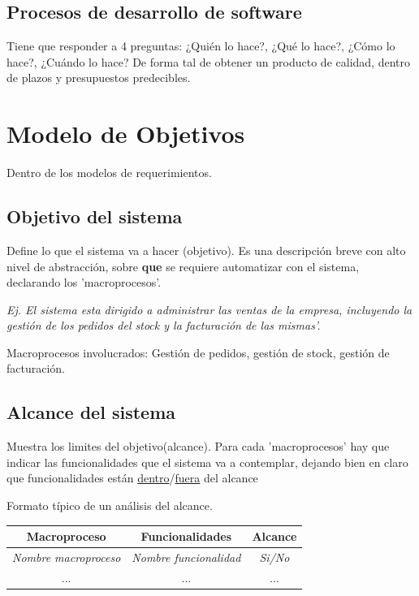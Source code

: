 \documentclass[titlepage,a4paper]{article}
\begin{document}
\subsection{Procesos de desarrollo de software}

Tiene que responder a 4 preguntas: ¿Quién lo hace?, ¿Qué lo hace?, ¿Cómo lo hace?, ¿Cuándo lo hace?
De forma tal de obtener un producto de calidad, dentro de plazos y presupuestos predecibles.

\section{Modelo de Objetivos}
Dentro de los modelos de requerimientos.
\subsection{Objetivo del sistema}
Define lo que el sistema va a hacer (objetivo).
Es una descripción breve con alto nivel de abstracción, sobre \textbf{que} se requiere automatizar con el sistema, declarando los 'macroprocesos'.

\textit{Ej.
El sistema esta dirigido a administrar las ventas de la empresa, incluyendo la gestión de los pedidos del stock y la facturación de las mismas'.}

Macroprocesos involucrados: Gestión de pedidos, gestión de stock, gestión de facturación.

\subsection{Alcance del sistema}
Muestra los limites del objetivo(alcance). Para cada 'macroprocesos' hay que indicar las funcionalidades que el sistema va a contemplar,
dejando bien en claro que funcionalidades están \underline{dentro}/\underline{fuera} del alcance

Formato típico de un análisis del alcance.



\begin{table}[!htb]
\begin{center}
\begin{tabular}{|l|l|c|}
\hline
\multicolumn{1}{|c|}{Macroproceso} & \multicolumn{1}{c|}{Funcionalidades} & Alcance \\ \hline
\textit{Nombre macroproceso}      & \textit{Nombre funcionalidad}       & \textit{Si/No} \\ \hline
 \multicolumn{1}{|c|}{...}          & \multicolumn{1}{c|}{...}            & ...            \\ \hline
\end{tabular}
\end{center}
\end{table}
\end{document}
